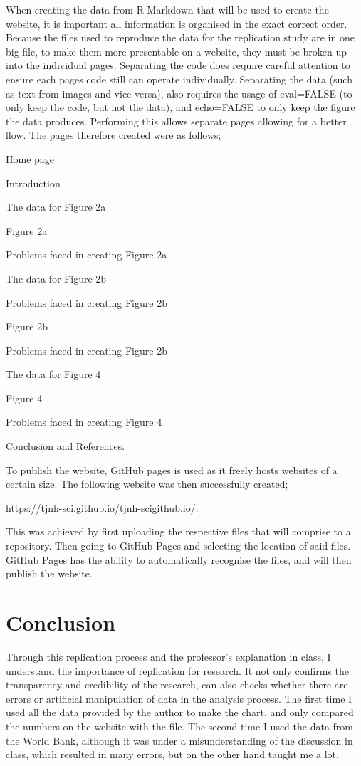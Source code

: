 \documentclass[
  man,
  floatsintext,
  longtable,
  nolmodern,
  notxfonts,
  notimes,
  colorlinks=true,linkcolor=blue,citecolor=blue,urlcolor=blue]{apa7}
\begin{document}
When creating the data from R Markdown that will be used to create the
website, it is important all information is organised in the exact
correct order. Because the files used to reproduce the data for the
replication study are in one big file, to make them more presentable on
a website, they must be broken up into the individual pages. Separating
the code does require careful attention to ensure each pages code still
can operate individually. Separating the data (such as text from images
and vice versa), also requires the usage of eval=FALSE (to only keep the
code, but not the data), and echo=FALSE to only keep the figure the data
produces. Performing this allows separate pages allowing for a better
flow. The pages therefore created were as follows;

Home page

Introduction

The data for Figure 2a

Figure 2a

Problems faced in creating Figure 2a

The data for Figure 2b

Problems faced in creating Figure 2b

Figure 2b

Problems faced in creating Figure 2b

The data for Figure 4

Figure 4~~~~~~

Problems faced in creating Figure 4

Conclusion and References.

To publish the website, GitHub pages is used as it freely hosts websites
of a certain size. The following website was then successfully created;

\url{https://tjnh-sci.github.io/tjnh-scigithub.io/}.

This was achieved by first uploading the respective files that will
comprise to a repository. Then going to GitHub Pages and selecting the
location of said files. GitHub Pages has the ability to automatically
recognise the files, and will then publish the website.

\section{Conclusion}\label{conclusion}

Through this replication process and the professor's explanation in
class, I understand the importance of replication for research. It not
only confirms the transparency and credibility of the research, can also
checks whether there are errors or artificial manipulation of data in
the analysis process. The first time I used all the data provided by the
author to make the chart, and only compared the numbers on the website
with the file. The second time I used the data from the World Bank,
although it was under a misunderstanding of the discussion in class,
which resulted in many errors, but on the other hand taught me a lot.
\end{document}
